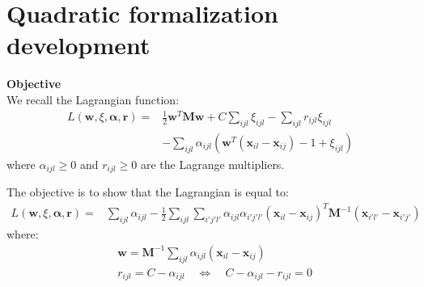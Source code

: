 \chapter{Quadratic formalization development}
\label{chap:app:qp_resolution}

\noindent \textbf{Objective} \\
We recall the Lagrangian function:
\begin{equation}
\begin{aligned}
L(\textbf{w},\xi,\boldsymbol{\alpha},\textbf{r}) 
= & 
\frac{1}{2} \textbf{w}^T \textbf{M} \textbf{w}
+ C \sum\limits_{ijl} \xi_{ijl} - \sum\limits_{ijl}r_{ijl} \xi_{ijl} \\
&  - \sum\limits_{ijl} \alpha_{ijl}\left( \textbf{w}^T(\textbf{x}_{il}-\textbf{x}_{ij})-1+\xi_{ijl} \right)
\label{eq:OptimizationDual_A}
\end{aligned}
\end{equation}
\noindent where $\alpha_{ijl} \geq 0$ and $r_{ijl} \geq 0$ are the Lagrange multipliers. 

\noindent The objective is to show that the Lagrangian is equal to:
\begin{equation}
\begin{aligned}
L(\textbf{w},\xi,\boldsymbol{\alpha},\textbf{r}) 
= & 
\sum\limits_{ijl} \alpha_{ijl} 
- \frac{1}{2} \sum\limits_{ijl} \sum\limits_{i'j'l'}
\alpha_{ijl} \alpha_{i'j'l'}
(\textbf{x}_{il}-\textbf{x}_{ij})^T
\textbf{M}^{-1}
(\textbf{x}_{i'l'}-\textbf{x}_{i'j'})
\end{aligned}
\label{eq:OptimDual_A}
\end{equation}
\noindent where:
\begin{align}
& \textbf{w} = \textbf{M}^{-1}  
\sum\limits_{ijl} \alpha_{ijl}(\textbf{x}_{il}-\textbf{x}_{ij}) \label{Eq:eqn_w_A} 
\\ 
& r_{ijl} = C - \alpha_{ijl} \quad \Leftrightarrow \quad C - \alpha_{ijl}-r_{ijl}= 0 \label{Eq:eqn_w2_A}
\end{align}


